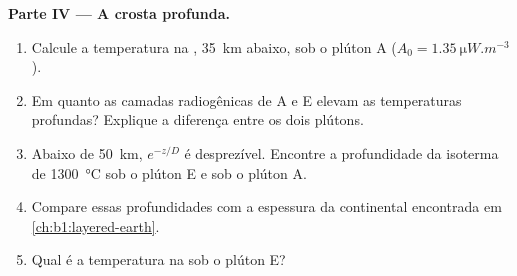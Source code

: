 \begin{problem}
\noindent\textbf{Parte IV --- A crosta profunda.}
\begin{enumerate}[resume]
  \item Calcule a temperatura na , \qty{35}{km} abaixo, sob o plúton A
        ($A_0 = \qty{1.35}{\micro W.m^{-3}}$).
  \item Em quanto as camadas radiogênicas de A e E elevam as temperaturas
        profundas? Explique a diferença entre os dois plútons.
  \item Abaixo de \qty{50}{km}, $e^{-z/D}$ é desprezível. Encontre a profundidade da
        isoterma de \qty{1300}{\degreeCelsius} sob o plúton E e sob o plúton A.
  \item Compare essas profundidades com a espessura da  continental
        encontrada em \cref{ch:b1:layered-earth}.
  \item Qual é a temperatura na  sob o plúton E?
\end{enumerate}
\end{problem}
